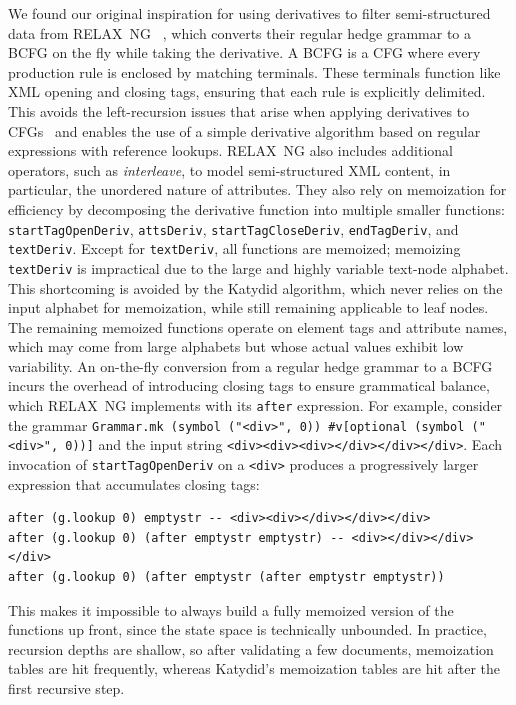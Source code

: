 \documentclass[acmsmall,%
  screen,%
  authorversion, %
  nonacm%
]{acmart}
\newcommand{\RelaxNG}{%
  RELAX~NG\xspace%
}
\newcommand{\BCFG}{\ac{BCFG}\xspace}
\newcommand{\CFG}{\ac{CFG}\xspace}
\newcommand{\CFGs}{\acp{CFG}\xspace}
\newcommand{\XML}{\ac{XML}\xspace}
\begin{document}
We found our original inspiration for using derivatives to filter semi-structured data from \RelaxNG~\cite{relaxng2001simple}, which converts their regular hedge grammar to a \BCFG on the fly while taking the derivative.
A \BCFG is a \CFG where every production rule is enclosed by matching terminals.
These terminals function like \XML opening and closing tags, ensuring that each rule is explicitly delimited.
This avoids the left-recursion issues that arise when applying derivatives to \CFGs~\cite{might2011parsing} and enables the use of a simple derivative algorithm based on regular expressions with reference lookups.
\RelaxNG also includes additional operators, such as \emph{interleave}, to model semi-structured \XML content, in particular, the unordered nature of attributes.
They also rely on memoization for efficiency by decomposing the derivative function into multiple smaller functions: \lstinline{startTagOpenDeriv}, \lstinline{attsDeriv}, \lstinline{startTagCloseDeriv}, \lstinline{endTagDeriv}, and \lstinline{textDeriv}.
Except for \lstinline{textDeriv}, all functions are memoized; memoizing \lstinline{textDeriv} is impractical due to the large and highly variable text-node alphabet.
This shortcoming is avoided by the Katydid algorithm, which never relies on the input alphabet for memoization, while still remaining applicable to leaf nodes.
The remaining memoized functions operate on element tags and attribute names, which may come from large alphabets but whose actual values exhibit low variability.
An on-the-fly conversion from a regular hedge grammar to a \BCFG incurs the overhead of introducing closing tags to ensure grammatical balance, which \RelaxNG implements with its \lstinline{after} expression.
For example, consider the grammar \lstinline{Grammar.mk (symbol ("<div>", 0)) #v[optional (symbol ("<div>", 0))]} and the input string \lstinline{<div><div><div></div></div></div>}.
Each invocation of \lstinline{startTagOpenDeriv} on a \lstinline{<div>} produces a progressively larger expression that accumulates closing tags:
\begin{lstlisting}
after (g.lookup 0) emptystr -- <div><div></div></div></div>
after (g.lookup 0) (after emptystr emptystr) -- <div></div></div></div>
after (g.lookup 0) (after emptystr (after emptystr emptystr))
\end{lstlisting}
This makes it impossible to always build a fully memoized version of the functions up front, since the state space is technically unbounded.
In practice, recursion depths are shallow, so after validating a few documents, memoization tables are hit frequently, whereas Katydid's memoization tables are hit after the first recursive step.
\end{document}
